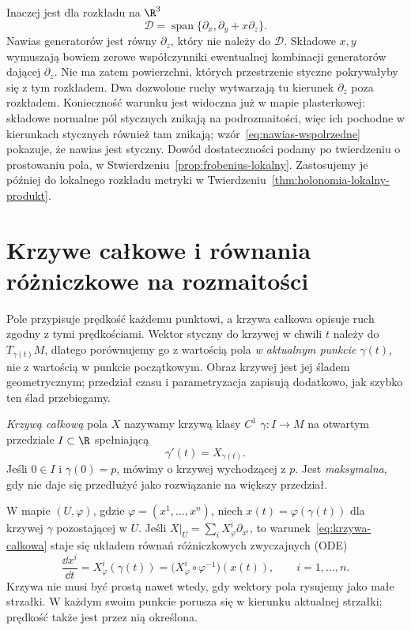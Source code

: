 \begin{uwaga}
Inaczej jest dla rozkładu na $\R^3$
\[
 \mathcal D
 =\operatorname{span}\{\partial_x,\partial_y+x\partial_z\}.
\]
Nawias generatorów jest równy $\partial_z$, który nie należy do $\mathcal D$.
Składowe $x,y$ wymuszają bowiem zerowe współczynniki
ewentualnej kombinacji generatorów dającej $\partial_z$.
Nie ma zatem powierzchni, których przestrzenie styczne pokrywałyby się
z tym rozkładem. Dwa dozwolone ruchy wytwarzają tu
kierunek $\partial_z$ poza rozkładem.
Konieczność warunku jest widoczna już w mapie
plasterkowej: składowe normalne pól stycznych znikają na
podrozmaitości, więc ich pochodne w kierunkach stycznych również
tam znikają; wzór~\eqref{eq:nawias-wspolrzedne} pokazuje,
że nawias jest styczny. Dowód dostateczności podamy po twierdzeniu
o prostowaniu pola, w Stwierdzeniu~\ref{prop:frobenius-lokalny}.
Zastosujemy je później do lokalnego rozkładu metryki
w Twierdzeniu~\ref{thm:holonomia-lokalny-produkt}.
\end{uwaga}

\section{Krzywe całkowe i równania różniczkowe na rozmaitości}
\label{sec:krzywe}

Pole przypisuje prędkość każdemu punktowi, a krzywa całkowa opisuje
ruch zgodny z tymi prędkościami. Wektor styczny do krzywej w chwili $t$
należy do $T_{\gamma(t)}M$, dlatego porównujemy go z wartością pola
\emph{w aktualnym punkcie} $\gamma(t)$, nie z wartością w punkcie
początkowym. Obraz krzywej jest jej śladem geometrycznym; przedział
czasu i parametryzacja zapisują dodatkowo, jak szybko ten ślad przebiegamy.

\begin{definicja}
\emph{Krzywą całkową} pola $X$ nazywamy krzywą klasy $C^1$
$\gamma\colon I\to M$ na otwartym przedziale $I\subset\R$ spełniającą
\begin{equation}\label{eq:krzywa-calkowa}
 \gamma'(t)=X_{\gamma(t)}.
\end{equation}
Jeśli $0\in I$ i $\gamma(0)=p$, mówimy o krzywej wychodzącej z $p$.
Jest \emph{maksymalna}, gdy nie daje się przedłużyć jako rozwiązanie
na większy przedział.
\end{definicja}

W mapie $(U,\varphi)$, gdzie $\varphi=(x^1,\ldots,x^n)$,
niech $x(t)=\varphi(\gamma(t))$ dla krzywej $\gamma$ pozostającej w $U$.
Jeśli $X|_U=\sum_i X_\varphi^i\partial_{x^i}$,
to warunek~\eqref{eq:krzywa-calkowa} staje się układem równań
różniczkowych zwyczajnych (ODE)
\[
 \frac{\dd x^i}{\dd t}
 =X_\varphi^i(\gamma(t))
 =\bigl(X_\varphi^i\circ\varphi^{-1}\bigr)(x(t)),
 \qquad i=1,\ldots,n.
\]
Krzywa nie musi być prostą nawet wtedy, gdy wektory pola rysujemy
jako małe strzałki. W każdym swoim punkcie porusza się w kierunku
aktualnej strzałki; prędkość także jest przez nią określona.

